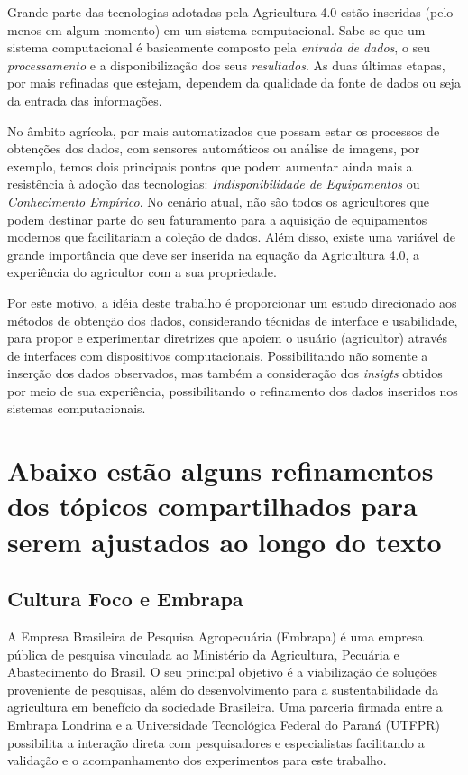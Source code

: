 \documentclass[12pt]{article}
\begin{document}
Grande parte das tecnologias adotadas pela Agricultura 4.0 estão inseridas (pelo menos em algum momento) em um sistema computacional. Sabe-se que um sistema computacional é basicamente composto pela \textit{entrada de dados}, o seu \textit{processamento} e a disponibilização dos seus \textit{resultados}. As duas últimas etapas, por mais refinadas que estejam, dependem da qualidade da fonte de dados ou seja da entrada das informações.

No âmbito agrícola, por mais automatizados que possam estar os processos de obtenções dos dados, com sensores automáticos ou análise de imagens, por exemplo, temos dois principais pontos que podem aumentar ainda mais a resistência à adoção das tecnologias: \textit{Indisponibilidade de Equipamentos} ou \textit{Conhecimento Empírico}. No cenário atual, não são todos os agricultores que podem destinar parte do seu faturamento para a aquisição de equipamentos modernos que facilitariam a coleção de dados. Além disso, existe uma variável de grande importância que deve ser inserida na equação da Agricultura 4.0, a experiência do agricultor com a sua propriedade.

Por este motivo, a idéia deste trabalho é proporcionar um estudo direcionado aos métodos de obtenção dos dados, considerando técnidas de interface e usabilidade, para propor e experimentar diretrizes que apoiem o usuário (agricultor) através de interfaces com dispositivos computacionais. Possibilitando não somente a inserção dos dados observados, mas também a consideração dos \textit{insigts} obtidos por meio de sua experiência, possibilitando o refinamento dos dados inseridos nos sistemas computacionais.

\section{Abaixo estão alguns refinamentos dos tópicos compartilhados para serem ajustados ao longo do texto}

\subsection{Cultura Foco e Embrapa}

A Empresa Brasileira de Pesquisa Agropecuária (Embrapa) é uma empresa pública de pesquisa vinculada ao Ministério da Agricultura, Pecuária e Abastecimento do Brasil. O seu principal objetivo é a viabilização de soluções proveniente de pesquisas, além do desenvolvimento para a sustentabilidade da agricultura em benefício da sociedade Brasileira. Uma parceria firmada entre a Embrapa Londrina e a Universidade Tecnológica Federal do Paraná (UTFPR) possibilita a interação direta com pesquisadores e especialistas facilitando a validação e o acompanhamento dos experimentos para este trabalho.
\end{document}
